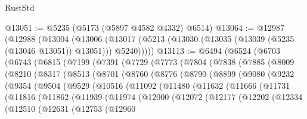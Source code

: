 \begin{lexlean}{RustStd}
\begin{coremodule}
@13051 := @5235 (@5173 (@5897 @4582 @4332) @6514)
@13064 := @12987
    (@12988
      (@13004
        (@13006 (@13017 (@5213 (@13030 (@13035 (@13039 (@5235 (@13046 @13051)) @13051))) @5240)))))
@13113 := @6494
    (@6524
      (@6703
        (@6743
          (@6815
            (@7199
              (@7391
                (@7729
                  (@7773
                    (@7804
                      (@7838
                        (@7885
                          (@8009
                            (@8210
                              (@8317
                                (@8513
                                  (@8701
                                    (@8760
                                      (@8776
                                        (@8790
                                          (@8899
                                            (@9080
                                              (@9232
                                                (@9354
                                                  (@9504
                                                    (@9529
                                                      (@10516
                                                        (@11092
                                                          (@11480
                                                            (@11632
                                                              (@11666
                                                                (@11731
                                                                  (@11816
                                                                    (@11862
                                                                      (@11939
                                                                        (@11974
                                                                          (@12000
                                                                            (@12072
                                                                              (@12177
                                                                                (@12202
                                                                                  (@12334
                                                                                    (@12510
                                                                                      (@12631
                                                                                        (@12753
                                                                                          (@12960

\end{coremodule}
\end{lexlean}
